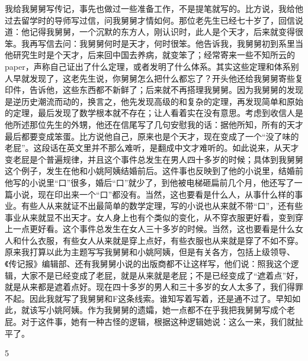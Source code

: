 我给我舅舅写传记，事先也做过一些准备工作，不是提笔就写的。比方说，我给他过去留学时的导师写过信，问我舅舅才情如何。那位老先生已经七十岁了，回信说道：他记得我舅舅，一个沉默的东方人，刚认识时，此人是个天才，后来就变得很笨。我再写信去问：我舅舅何时是天才，何时很笨。他告诉我，我舅舅初到系里当他研究生时是个天才，后来回中国去养病，就变笨了；经常寄来一些不知所云的paper，声称自己证出了什么定理，或者发明了什么体系。其实这些定理和体系别人早就发现了，这老先生说，你舅舅怎么把什么都忘了？开头他还给我舅舅寄些复印件，告诉他，这些东西都不新鲜了；后来就不再搭理我舅舅。因为我舅舅的发现是逆历史潮流而动的，换言之，他先发现高级的和复杂的定理，再发现简单和原始的定理，最后发现了数学根本就不存在；让人看着实在没有意思。考虑到收信人是他所述那位先生的外甥，他还在信尾写了几句安慰我的话：据他所知，所有的天才最后都要变成笨蛋。比方说他自己，原来也是个天才，现在变成了一个“没了味的老屁”。这段话在英文里并不那么难听，是翻成中文才难听的。如此说来，从天才变老屁是个普遍规律，并且这个事件总发生在男人四十多岁的时候；具体到我舅舅这个例子，发生在他和小姚阿姨结婚前后。这件事也反映到了他的小说里，结婚前他写的小说里“口”很多，婚后“口”就少了，到他被电梯砸扁前几个月，他还写了一篇小说，现在印出来一个“口”都没有。当然，这也要看是什么人，从事什么样的事业。有些人从来就证不出最简单的数学定理，写的小说也从来就不带“口”，还有些事业从来就显不出天才。女人身上也有个类似的变化，从不穿衣服更好看，变到穿上一点更好看。这个事件总发生在女人三十多岁的时候。当然，这也要看是什么女人和什么衣服，有些女人从来就是穿上点好，有些衣服也从来就是穿了不如不穿。原来我打算以此为主题写写我舅舅和小姚阿姨，但是有关各方，包括上级领导、《传记报》编辑部、还有我舅舅小说的出版商都不让这样写，他们说：照我这个逻辑，大家不是已经变成了老屁，就是从来就是老屁；不是已经变成了“遮着点”好，就是从来都是遮着点好。现在四十多岁的男人和三十多岁的女人太多了，我们得罪不起。因此我就写了我舅舅和F这条线索。谁知写着写着，还是通不过了。早知如此，就该写小姚阿姨。作为我舅舅的遗孀，她一点都不在乎我把我舅舅写成个老屁。对于这件事，她有一种古怪的逻辑，根据这种逻辑她说：这么一来，我们就扯平了。 

5 

